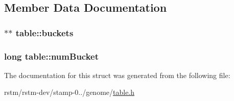 \subsection{Member Data Documentation}
\hypertarget{structtable_a553b8c1676f4642aec256340cb37fc37}{
\subsubsection[{buckets}]{$\ast$$\ast$ table\-::buckets}}\label{structtable_a553b8c1676f4642aec256340cb37fc37}
\hypertarget{structtable_a647f756789799968e9287e04fc712f8e}{
\subsubsection[{num\-Bucket}]{\setlength{\rightskip}{0pt plus 5cm}long table\-::num\-Bucket}}\label{structtable_a647f756789799968e9287e04fc712f8e}


The documentation for this struct was generated from the following file\-:\begin{DoxyCompactItemize}
\item 
rstm/rstm-\/dev/stamp-\/0../genome/\hyperlink{table_8h}{table.\-h}\end{DoxyCompactItemize}
